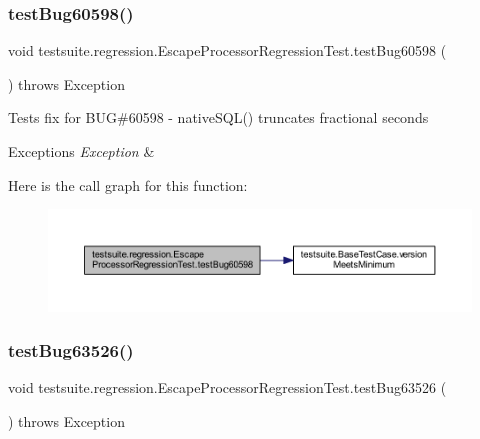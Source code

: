 \subsubsection{\texorpdfstring{test\+Bug60598()}{testBug60598()}}
{\footnotesize\ttfamily void testsuite.\+regression.\+Escape\+Processor\+Regression\+Test.\+test\+Bug60598 (\begin{DoxyParamCaption}{ }\end{DoxyParamCaption}) throws Exception}

Tests fix for B\+UG\#60598 -\/ native\+S\+Q\+L() truncates fractional seconds


\begin{DoxyExceptions}{Exceptions}
{\em Exception} & \\
\hline
\end{DoxyExceptions}
Here is the call graph for this function\+:
\nopagebreak
\begin{figure}[H]
\begin{center}
\leavevmode
\includegraphics[width=350pt]{classtestsuite_1_1regression_1_1_escape_processor_regression_test_a39062afbb30ff8c361ed8fdfaad6f971_cgraph}
\end{center}
\end{figure}
\mbox{\label{classtestsuite_1_1regression_1_1_escape_processor_regression_test_a372b0f782e66be889f1351b24530cdc0}} 
\subsubsection{\texorpdfstring{test\+Bug63526()}{testBug63526()}}
{\footnotesize\ttfamily void testsuite.\+regression.\+Escape\+Processor\+Regression\+Test.\+test\+Bug63526 (\begin{DoxyParamCaption}{ }\end{DoxyParamCaption}) throws Exception}

